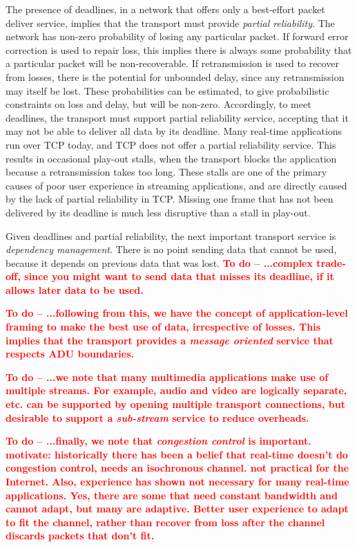 \documentclass{sig-alternate-05-2015}
\newcommand{\todo}[1]{\textbf{\textcolor{red}{To do -- #1}}}
\begin{document}
The presence of deadlines, in a network that offers only a best-effort
packet deliver service, implies that the transport must provide
\emph{partial reliability}.
The network has non-zero probability of losing any particular packet. 
If forward error correction is used to repair loss, this implies there is
always some probability that a particular packet will be non-recoverable.
If retransmission is used to recover from losses, there is the potential 
for unbounded delay, since any retransmission may itself be lost. 
These probabilities can be estimated, to give probabilistic constraints
on loss and delay, but will be non-zero. Accordingly, to meet deadlines,
the transport must support partial reliability service, accepting that
it may not be able to deliver all data by its deadline.
Many real-time applications run over TCP today, and TCP does not offer a
partial reliability service. This results in occasional play-out stalls, 
when the transport blocks the application because a retransmission takes
too long. These stalls are one of the primary causes of poor user
experience in streaming applications, and are directly caused by the lack
of partial reliability in TCP. Missing one frame that has not been
delivered by its deadline is much less disruptive than a stall in play-out. 

Given deadlines and partial reliability, the next important transport
service is \emph{dependency management}. There is no point sending data
that cannot be used, because it depends on previous data that was lost. 
\todo{...complex trade-off, since you might want to send data that misses its 
   deadline, if it allows later data to be used.}

\todo{...following from this, we have the concept of application-level framing
   to make the best use of data, irrespective of losses. This implies that
   the transport provides a \emph{message oriented} service that respects
   ADU boundaries.}

\todo{...we note that many multimedia applications make use of multiple streams. 
   For example, audio and video are logically separate, etc.
   can be supported by opening multiple transport connections, but
   desirable to support a \emph{sub-stream} service to reduce overheads.}

\todo{...finally, we note that \emph{congestion control} is important. 
   motivate: historically there has been a belief that real-time doesn't 
   do congestion control, needs an isochronous channel. 
   not practical for the Internet. 
   Also, experience has shown not necessary for many real-time applications.
   Yes, there are some that need constant bandwidth and cannot adapt, but
   many are adaptive. 
   Better user experience to adapt to fit the channel, rather than recover
   from loss after the channel discards packets that don't fit. }
\end{document}
